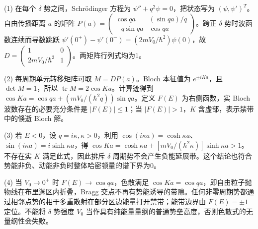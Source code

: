 (1) 在每个 \(\delta \) 势之间，Schrödinger 方程为 \(\psi''+q^2\psi=0\)，把状态写为 \((\psi,\psi')^T\)。自由传播距离 \(a\) 的矩阵 \(P(a)=\begin{pmatrix}\cos qa&(\sin qa)/q\\-q\sin qa&\cos qa\end{pmatrix}\)。跨正 \(\delta \) 势时波函数连续而导数跳跃 \(\psi'(0^+)-\psi'(0^-)=(2mV_0/\hbar^2)\psi(0)\)，故 \(D=\begin{pmatrix}1&0\\2mV_0/\hbar^2&1\end{pmatrix}\)。两矩阵行列式均为1。

(2) 每周期单元转移矩阵可取 \(M=DP(a)\)。Bloch 本征值为 \(e^{\pm iKa}\)，且 \(\det M=1\)，所以 \(\operatorname{tr}M=2\cos Ka\)。计算迹得到 \(\cos Ka=\cos qa+(mV_0/(\hbar^2q))\sin qa\)。定义 \(F(E)\) 为右侧函数，实 Bloch 波数存在的必要充分条件是 \(|F(E)|\le1\)；当 \(|F(E)|>1\)，\(K\) 含虚部，表示禁带中的倏逝 Bloch 解。

(3) 若 \(E<0\)，设 \(q=i\kappa,\kappa>0\)，利用 \(\cos(i\kappa a)=\cosh\kappa a\)、\(\sin(i\kappa a)=i\sinh\kappa a\)，得 \(\cos Ka=\cosh\kappa a+[mV_0/(\hbar^2\kappa)]\sinh\kappa a>1\)。不存在实 \(K\) 满足此式，因此排斥 \(\delta \) 周期势不会产生负能延展带。这个结论也符合势能非负、动能非负时整体哈密顿量的谱下界为0。

(4) 当 \(V_0\to0^+\) 时 \(F(E)\to\cos qa\)，色散满足 \(\cos Ka=\cos qa\)，即自由粒子抛物线在布里渊区内折叠，Bragg 交点不再有势能诱导的带隙。任何非零周期势都通过相邻点势的相干多重散射在部分区边能量打开禁带；能带边界由 \(F(E)=\pm1\) 定位。不能将 \(\delta \) 势强度 \(V_0\) 当作具有纯能量量纲的普通势垒高度，否则色散式的无量纲性会失败。
